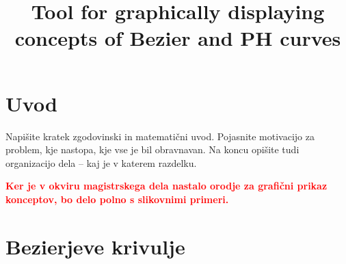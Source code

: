 \documentclass[isrm2, tisk]{fmfdelo}
\title{Tool for graphically displaying concepts of Bezier and PH curves}
\newcommand{\mycomment}[1]{\textbf{\textcolor{red}{#1}}}
\begin{document}
    \section{Uvod}
    Napišite kratek zgodovinski in matematični uvod. Pojasnite motivacijo za problem, kje
    nastopa, kje vse je bil obravnavan. Na koncu opišite tudi organizacijo dela -- kaj je v
    katerem razdelku.


    \mycomment{Ker je v okviru magistrskega dela nastalo orodje za grafični prikaz konceptov, bo delo polno s slikovnimi primeri.}

    \newpage


    \section{Bezierjeve krivulje}\label{sec:bezierjeve-krivulje}
\end{document}
